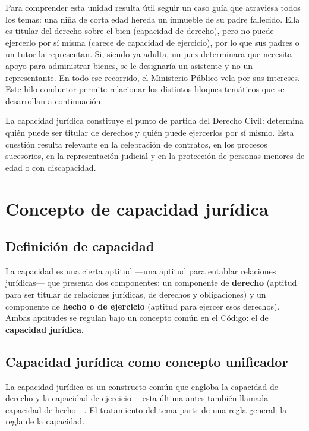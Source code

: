 \documentclass[12pt,oneside]{book}
\begin{document}
Para comprender esta unidad resulta útil seguir un caso guía que atraviesa todos los temas: una niña de corta edad hereda un inmueble de su padre fallecido. Ella es titular del derecho sobre el bien (capacidad de derecho), pero no puede ejercerlo por sí misma (carece de capacidad de ejercicio), por lo que sus padres o un tutor la representan. Si, siendo ya adulta, un juez determinara que necesita apoyo para administrar bienes, se le designaría un asistente y no un representante. En todo ese recorrido, el Ministerio Público vela por sus intereses. Este hilo conductor permite relacionar los distintos bloques temáticos que se desarrollan a continuación.

\begin{note}
La capacidad jurídica constituye el punto de partida del Derecho Civil: determina quién puede ser titular de derechos y quién puede ejercerlos por sí mismo. Esta cuestión resulta relevante en la celebración de contratos, en los procesos sucesorios, en la representación judicial y en la protección de personas menores de edad o con discapacidad.
\end{note}

\section{Concepto de capacidad jurídica}

\subsection{Definición de capacidad}

La capacidad es una cierta aptitud —una aptitud para entablar relaciones jurídicas— que presenta dos componentes: un componente de \textbf{derecho} (aptitud para ser titular de relaciones jurídicas, de derechos y obligaciones) y un componente de \textbf{hecho o de ejercicio} (aptitud para ejercer esos derechos). Ambas aptitudes se regulan bajo un concepto común en el Código: el de \textbf{capacidad jurídica}.

\subsection{Capacidad jurídica como concepto unificador}

La capacidad jurídica es un constructo común que engloba la capacidad de derecho y la capacidad de ejercicio —esta última antes también llamada capacidad de hecho—. El tratamiento del tema parte de una regla general: la regla de la capacidad.
\end{document}

